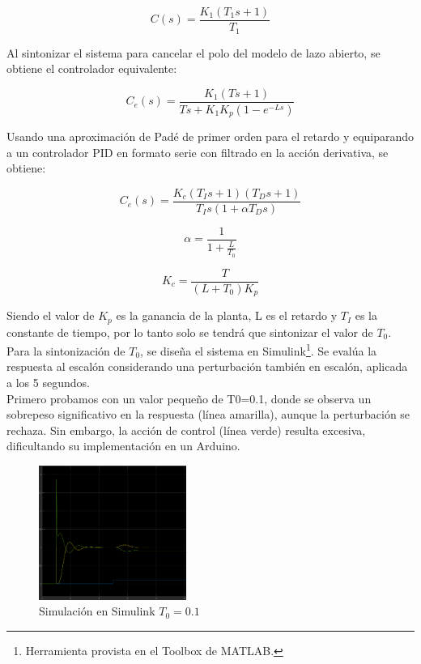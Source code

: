 \documentclass[letterpaper, 10 pt, conference]{ieeeconf}  %
\begin{document}
\begin{equation*}
  C(s) = \frac{K_{1}(T_{1}s+1)}{T_{1}}
\end{equation*}

Al sintonizar el sistema para cancelar el polo del modelo de lazo abierto, se obtiene el controlador equivalente:

\begin{equation*}
  C_{e}(s) = \frac{K_{1}(Ts+1)}{Ts+K_{1}K_{p}(1-e^{-Ls})}
\end{equation*}

Usando una aproximación de Padé de primer orden para el retardo y equiparando a un controlador PID en formato serie con filtrado en la acción derivativa, se obtiene:

\begin{equation*}
  C_{e}(s) = \frac{K_{c}(T_{I}s+1)(T_{D}s+1)}{T_{I}s(1+\alpha T_{D}s)}
\end{equation*}

\begin{equation*}
  \alpha = \frac{1}{1+\frac{L}{T_{0}}}
\end{equation*}

\begin{equation*}
  K_c = \frac{T}{(L+T_{0})K_p}
\end{equation*}

 Siendo el valor de $K_{p}$ es la ganancia de la planta, L es el retardo y $T_{I}$ es la constante de tiempo, por lo tanto solo se tendrá que sintonizar el valor de $T_{0}$. \\
Para la sintonización de $T_0$, se diseña el sistema en Simulink\footnote{Herramienta provista en el Toolbox de MATLAB.}. Se evalúa la respuesta al escalón considerando una perturbación también en escalón, aplicada a los 5 segundos. \\
Primero probamos con un valor pequeño de T0=0.1, donde se observa un sobrepeso significativo en la respuesta (línea amarilla), aunque la perturbación se rechaza. Sin embargo, la acción de control (línea verde) resulta excesiva, dificultando su implementación en un Arduino.\\

\begin{figure}[H]
  \centering
  \includegraphics[width=0.43\textwidth]{./IMAGENES/pid1.png}
  \caption{Simulación en Simulink \(T_{0} = 0.1\)}
  \label{fig:pid1}
\end{figure}
\end{document}
